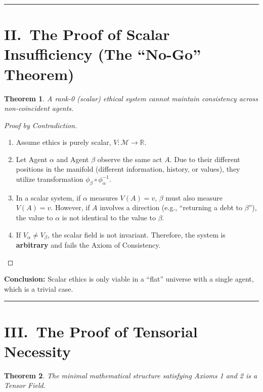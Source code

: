 \documentclass[12pt]{article}
\newtheorem{theorem}{Theorem}
\theoremstyle{remark}
\begin{document}
\bigskip
\hrule
\bigskip

\section*{II.\ The Proof of Scalar Insufficiency (The ``No-Go'' Theorem)}

\begin{theorem}
A rank-0 (scalar) ethical system cannot maintain consistency across
non-coincident agents.
\end{theorem}

\begin{proof}[Proof by Contradiction]
\begin{enumerate}
    \item Assume ethics is purely scalar, $V : \mathcal{M} \to \mathbb{R}$.

    \item Let Agent $\alpha$ and Agent $\beta$ observe the same act $A$. Due to
    their different positions in the manifold (different information, history, or
    values), they utilize transformation $\phi_\beta \circ \phi_\alpha^{-1}$.

    \item In a scalar system, if $\alpha$ measures $V(A) = v$, $\beta$ must
    also measure $V(A) = v$. However, if $A$ involves a direction (e.g.,
    ``returning a debt to $\beta$''), the value to $\alpha$ is not identical to
    the value to $\beta$.

    \item If $V_\alpha \neq V_\beta$, the scalar field is not invariant.
    Therefore, the system is \textbf{arbitrary} and fails the Axiom of
    Consistency.
\end{enumerate}
\end{proof}

\noindent\textbf{Conclusion:} Scalar ethics is only viable in a ``flat''
universe with a single agent, which is a trivial case.

\bigskip
\hrule
\bigskip

\section*{III.\ The Proof of Tensorial Necessity}

\begin{theorem}
The minimal mathematical structure satisfying Axioms 1 and 2 is a Tensor Field.
\end{theorem}
\end{document}
